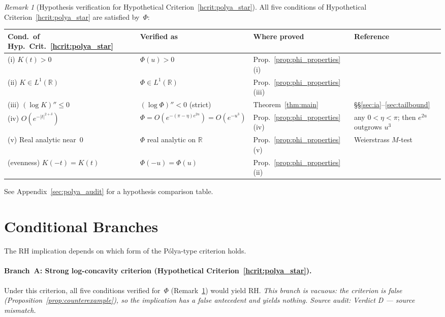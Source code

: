 \documentclass[11pt]{article}
\theoremstyle{definition}
\theoremstyle{remark}
\newtheorem{remark}[theorem]{Remark}
\begin{document}
\begin{remark}[Hypothesis verification for Hypothetical Criterion~\ref{hcrit:polya_star}]%
\label{rem:polya_hyp}
All five conditions of Hypothetical Criterion~\ref{hcrit:polya_star} are satisfied by~$\Phi$:

\medskip
\noindent\begin{tabular}{@{}llll@{}}
\toprule
Cond.\ of Hyp.\ Crit.~\ref{hcrit:polya_star} & Verified as & Where proved & Reference \\
\midrule
(i) $K(t) > 0$ & $\Phi(u) > 0$ & Prop.~\ref{prop:phi_properties}(i) &
  \cite[Thm.~A]{csordas1989} \\
(ii) $K \in L^1(\mathbb{R})$ & $\Phi \in L^1(\mathbb{R})$ &
  Prop.~\ref{prop:phi_properties}(iii) & \cite[\S2.10]{titchmarsh1986} \\
(iii) $(\log K)'' \leq 0$ & $(\log\Phi)'' < 0$ (strict) & Theorem~\ref{thm:main} &
  \S\S\ref{sec:ia}--\ref{sec:tailbound} \\
(iv) $O(e^{-|t|^{2+\delta}})$ & $\Phi = O(e^{-(\pi-\eta) e^{2u}}) = O(e^{-u^3})$ &
  Prop.~\ref{prop:phi_properties}(iv) & any $0<\eta<\pi$; then $e^{2u}$ outgrows $u^3$ \\
(v) Real analytic near~$0$ & $\Phi$ real analytic on $\mathbb{R}$ &
  Prop.~\ref{prop:phi_properties}(v) & Weierstrass $M$-test \\
(evenness) $K(-t)=K(t)$ & $\Phi(-u) = \Phi(u)$ & Prop.~\ref{prop:phi_properties}(ii) &
  \cite[\S2.10]{titchmarsh1986} \\
\bottomrule
\end{tabular}

\medskip
\noindent See Appendix~\ref{sec:polya_audit} for a hypothesis comparison table.
\end{remark}

\section{Conditional Branches}\label{sec:branches}

The RH implication depends on which form of the P\'{o}lya-type criterion holds.

\paragraph{Branch~A: Strong log-concavity criterion (Hypothetical Criterion~\ref{hcrit:polya_star}).}
Under this criterion, all five conditions verified for~$\Phi$ (Remark~\ref{rem:polya_hyp})
would yield RH.
\emph{This branch is vacuous: the criterion is false
(Proposition~\ref{prop:counterexample}), so the implication has a false
antecedent and yields nothing.
Source audit: Verdict D --- source mismatch.}
\end{document}
